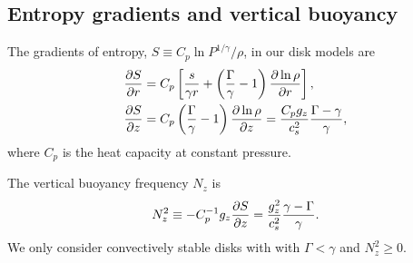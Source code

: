 \subsection{Entropy gradients and vertical buoyancy}
The gradients of entropy, $S\equiv
C_p\ln{P^{1/\gamma}/\rho}$, in our disk models are
\begin{subequations}
\begin{align}
  &\frac{\partial S}{\partial r} = C_p\left[\frac{s}{\gamma r} +
    \left(\frac{\Gamma}{\gamma}-1\right)\frac{\partial \ln{\rho}}{\partial
       r}\right],\\
  &\frac{\partial S}{\partial z} = C_p
  \left(\frac{\Gamma}{\gamma}-1\right)\frac{\partial \ln{\rho}}{\partial z} = {C_p g_z \over c_s^2} {\Gamma - \gamma \over \gamma},\label{dSdz}
\end{align} 
\end{subequations}
 where $C_p$ is the heat capacity at
constant pressure. 

The vertical buoyancy frequency $N_z$ is 
\begin{align}
  N_z^2 \equiv - C_p^{-1}g_z \frac{\p S}{\p z} = {g_z^2 \over c_s^2}{\gamma - \Gamma \over \gamma}. %
    \label{nzsq_def}
\end{align}
We only consider convectively stable disks with with $\Gamma <
\gamma$ and  $N_z^2\geq0$. %

